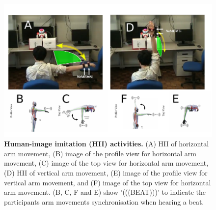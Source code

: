 \begin{figure}
  \centering
  \includegraphics[width=1.0\textwidth]{hii}
    \caption{
	{\bf Human-image imitation (HII) activities.} 
		(A) HII of horizontal arm movement, 
		(B) image of the profile view for horizontal arm movement,
		(C) image of the top view for horizontal arm movement,
		(D) HII of vertical arm movement, 
		(E) image of the profile view for vertical arm movement, and
		(F) image of the top view for horizontal arm movement.
		(B, C, F and E) show '(((BEAT)))' to indicate the participants
		arm movements synchronisation when hearing a beat.
        }
    \label{fig:hii}
\end{figure}







